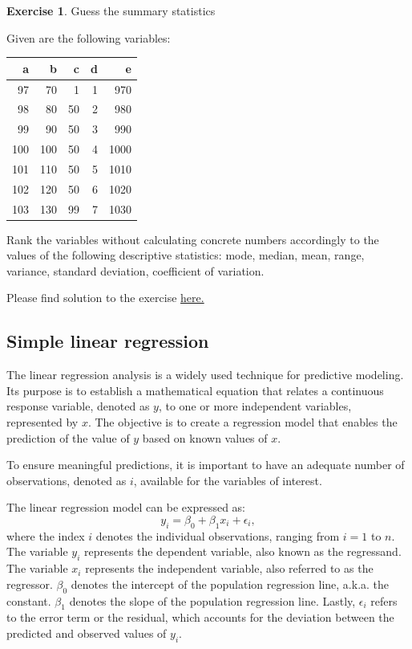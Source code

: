 \documentclass[
  12pt,
  oneside]{book}
\theoremstyle{definition}
\theoremstyle{definition}
\theoremstyle{definition}
\newtheorem{exercise}{Exercise}[chapter]
\theoremstyle{definition}
\theoremstyle{remark}
\begin{document}
\begin{exercise}
\protect\hypertarget{exr:guessstat}{}\label{exr:guessstat}Guess the summary statistics

Given are the following variables:

\begin{longtable}[]{@{}rrrrr@{}}
\toprule()
a & b & c & d & e \\
\midrule()
\endhead
97 & 70 & 1 & 1 & 970 \\
98 & 80 & 50 & 2 & 980 \\
99 & 90 & 50 & 3 & 990 \\
100 & 100 & 50 & 4 & 1000 \\
101 & 110 & 50 & 5 & 1010 \\
102 & 120 & 50 & 6 & 1020 \\
103 & 130 & 99 & 7 & 1030 \\
\bottomrule()
\end{longtable}

Rank the variables without calculating concrete numbers accordingly to the values of the following descriptive statistics: mode, median, mean, range, variance, standard deviation, coefficient of variation.

Please find solution to the exercise \protect\hyperlink{sol:guessstat}{here.}
\end{exercise}

\hypertarget{simple-linear-regression}{%
\subsection{Simple linear regression}\label{simple-linear-regression}}

The linear regression analysis is a widely used technique for predictive modeling. Its purpose is to establish a mathematical equation that relates a continuous response variable, denoted as \(y\), to one or more independent variables, represented by \(x\). The objective is to create a regression model that enables the prediction of the value of \(y\) based on known values of \(x\).

To ensure meaningful predictions, it is important to have an adequate number of observations, denoted as \(i\), available for the variables of interest.

The linear regression model can be expressed as:
\[
y_i = \beta_{0} + \beta_{1} x_i + \epsilon_i,
\]
where the index \(i\) denotes the individual observations, ranging from \(i = 1\) to \(n\). The variable \(y_i\) represents the dependent variable, also known as the regressand. The variable \(x_i\) represents the independent variable, also referred to as the regressor. \(\beta_0\) denotes the intercept of the population regression line, a.k.a. the constant. \(\beta_1\) denotes the slope of the population regression line. Lastly, \(\epsilon_i\) refers to the error term or the residual, which accounts for the deviation between the predicted and observed values of \(y_i\).
\end{document}
